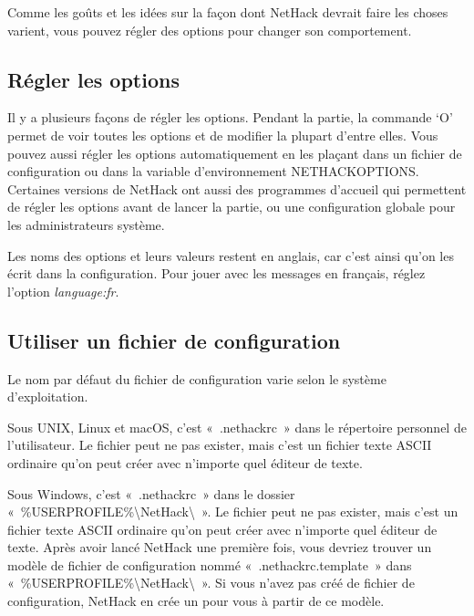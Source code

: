 \documentclass[titlepage]{article}
\begin{document}
Comme les goûts et les idées sur la façon dont NetHack devrait faire les
choses varient, vous pouvez régler des options pour changer son
comportement.

\subsection{Régler les options}



Il y a plusieurs façons de régler les options.
Pendant la partie, la commande `O' permet de voir toutes les options
et de modifier la plupart d'entre elles.
Vous pouvez aussi régler les options automatiquement en les plaçant dans un
fichier de configuration ou dans la variable d'environnement
NETHACKOPTIONS.
Certaines versions de NetHack ont aussi des programmes d'accueil qui
permettent de régler les options avant de lancer la partie, ou une
configuration globale pour les administrateurs système.


Les noms des options et leurs valeurs restent en anglais, car c'est ainsi
qu'on les écrit dans la configuration.
Pour jouer avec les messages en français, réglez l'option
\textit{language:fr}.

\subsection{Utiliser un fichier de configuration}



Le nom par défaut du fichier de configuration varie selon le système
d'exploitation.


Sous
UNIX,
Linux et macOS, c'est «~.nethackrc~» dans le répertoire personnel de
l'utilisateur.
Le fichier peut ne pas exister, mais c'est un fichier texte ASCII ordinaire
qu'on peut créer avec n'importe quel éditeur de texte.


Sous Windows, c'est «~.nethackrc~» dans le dossier
«~\%USERPROFILE\%\textbackslash{}NetHack\textbackslash{}~».
Le fichier peut ne pas exister, mais c'est un fichier texte ASCII ordinaire
qu'on peut créer avec n'importe quel éditeur de texte.
Après avoir lancé NetHack une première fois, vous devriez trouver un
modèle de fichier de configuration nommé «~.nethackrc.template~» dans
«~\%USERPROFILE\%\textbackslash{}NetHack\textbackslash{}~».
Si vous n'avez pas créé de fichier de configuration, NetHack en crée un
pour vous à partir de ce modèle.
\end{document}
